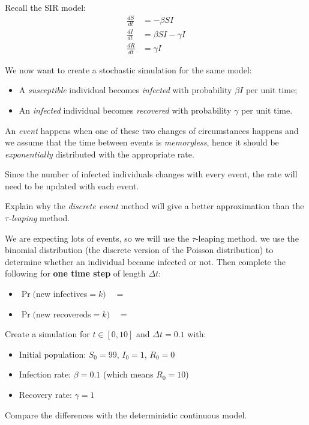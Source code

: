 \begin{solution}
\begin{slide}
\end{slide}
	
\end{solution}



\begin{slide}
\question \label{SIR_stochastic}
	
Recall the SIR model:
\begin{align*}
\frac{dS}{dt} 	& = - \beta SI \\
\frac{dI}{dt} & = \beta SI - \gamma I \\
\frac{dR}{dt} & = \gamma I
\end{align*}

We now want to create a stochastic simulation for the same model:
\begin{itemize}
	\item A \textit{susceptible} individual becomes \textit{infected} with probability $\beta I$ per unit time;
	\item An \textit{infected} individual becomes \textit{recovered} with probability $\gamma$ per unit time.
\end{itemize}

An \textit{event} happens when one of these two changes of circumstances happens and we assume that the time between events is \textit{memoryless}, hence it should be \textit{exponentially} distributed with the appropriate rate.

Since the number of infected individuals changes with every event, the rate will need to be updated with each event.

\begin{parts}
	\item Explain why the \textit{discrete event} method will give a better approximation than the  \textit{$\tau$-leaping} method.
	\item We are expecting lots of events, so we will use the $\tau$-leaping method.
		we use the binomial distribution (the discrete version of the Poisson distribution) to determine whether an individual became infected or not.
		Then complete the following for \textbf{one time step} of length $\Delta t$:
		\begin{itemize}
			\item $\Pr($new infectives$=k)\quad =\quad $
			\item $\Pr($new recovereds$=k)\quad =\quad $
		\end{itemize}
	\item Create a simulation for $t\in [0,10]$ and $\Delta t = 0.1$ with:
	\begin{itemize}
		\item Initial population: $S_0=99$, $I_0=1$, $R_0=0$
		\item Infection rate: $\beta=0.1$ (which means $R_0=10$)
		\item Recovery rate: $\gamma =1$
	\end{itemize}
	\item Compare the differences with the deterministic continuous model.
\end{parts}

\end{slide}


